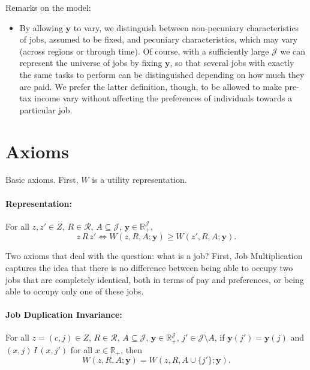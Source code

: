 \documentclass[12pt,thmsb]{article}
\begin{document}
Remarks on the model:
\begin{itemize}
    \item By allowing $\mathbf{y}$ to vary, we distinguish between non-pecuniary characteristics of jobs, assumed to be fixed, and pecuniary characteristics, which may vary (across regions or through time). Of course, with a sufficiently large $\mathcal{J}$ we can represent the universe of jobs by fixing $\mathbf{y}$, so that several jobs with exactly the same tasks to perform can be distinguished depending on how much they are paid. We prefer the latter definition, though, to be allowed to make pre-tax income vary without affecting the preferences of individuals towards a particular job.
\end{itemize}

\section{Axioms}

Basic axioms. First, $W$ is a utility representation.

\paragraph{Representation:} For all $z,z'\in Z$, $R\in \mathcal{R}$, $A\subseteq \mathcal{J}$, $\mathbf{y}\in \mathbb{R}_{+}^{\mathcal{J}}$,
\begin{equation*}
z\,R\,z' \Leftrightarrow W(z,R,A;\mathbf{y})\geq W(z',R,A;\mathbf{y}).
\end{equation*}

Two axioms that deal with the question: what is a job? First, Job Multiplication captures the idea that there is no difference between being able to occupy two jobs that are completely identical, both in terms of pay and preferences, or being able to occupy only one of these jobs.

\paragraph{Job Duplication Invariance:} For all $z=(c,j)\in Z$, $R\in \mathcal{R}$, $A\subseteq \mathcal{J}$, $\mathbf{y}\in \mathbb{R}_{+}^{\mathcal{J}}$, $j'\in \mathcal{J}\setminus A$, if $\mathbf{y}(j')=\mathbf{y}(j)$ and $(x,j)\,I\,(x,j')$ for all $x\in\mathbb{R}_{+}$, then
\begin{equation*}
W(z,R,A;\mathbf{y})=W(z,R,A\cup\{j'\};\mathbf{y}).
\end{equation*}
\end{document}
